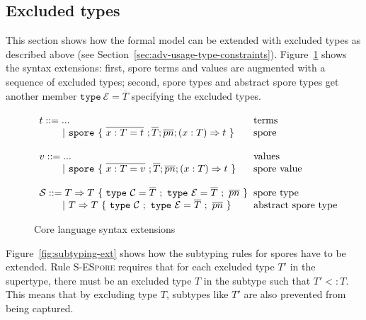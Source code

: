 \documentclass{llncs}
\newcommand{\seq}[1]{\overline{#1}}
\newcommand{\ba}{\begin{array}}
\newcommand{\ea}{\end{array}}
\newcommand{\gap}{\quad\quad}
\begin{document}
\subsection{Excluded types}

This section shows how the formal model can be extended with excluded types as described above (see Section~\ref{sec:adv-usage-type-constraints}). Figure~\ref{fig:syntax-ext} shows the syntax extensions: first, spore terms and values are augmented with a sequence of excluded types; second, spore types and abstract spore types get another member $\texttt{type}~\mathcal{E} = \seq{T}$ specifying the excluded types.

\vspace{2mm}
\begin{figure}[ht!]
  \centering

  $\ba[t]{l@{\hspace{2mm}}l}
t ::=     ...                               & \mbox{terms}
\\
\gap ~|~  \texttt{spore}~\{~\seq{x : T = t}~; \seq{T}; \seq{pn} ; (x: T) \Rightarrow t~\}  & \mbox{spore}
\\
 & \\
v ::=     ...                               & \mbox{values}
\\
\gap ~|~  \texttt{spore}~\{~\seq{x : T = v}~; \seq{T}; \seq{pn} ; (x: T) \Rightarrow t~\}  & \mbox{spore value}
\\
 & \\
\mathcal{S} ::= T \Rightarrow T~\{~\texttt{type}~\mathcal{C} = \seq{T}~;~\texttt{type}~\mathcal{E} = \seq{T}~;~\seq{pn}~\}   & \mbox{spore type}
\\
\gap ~|~  T \Rightarrow T~\{~\texttt{type}~\mathcal{C}~;~\texttt{type}~\mathcal{E} = \seq{T}~;~\seq{pn}~\}   & \mbox{abstract spore type}
\\
\ea$

  \caption{Core language syntax extensions}
  \label{fig:syntax-ext}
  \vspace{-5mm}
\end{figure}

Figure~\ref{fig:subtyping-ext} shows how the subtyping rules for spores have to be extended. Rule \textsc{S-ESpore} requires that for each excluded type $T'$ in the supertype, there must be an excluded type $T$ in the subtype such that $T' <: T$. This means that by excluding type $T$, subtypes like $T'$ are also prevented from being captured.
\end{document}
